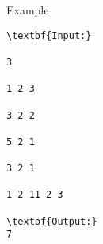 Example
\begin{verbatim}
\textbf{Input:}

3

1 2 3

3 2 2

5 2 1

3 2 1

1 2 11 2 3

\textbf{Output:}
7\end{verbatim}
